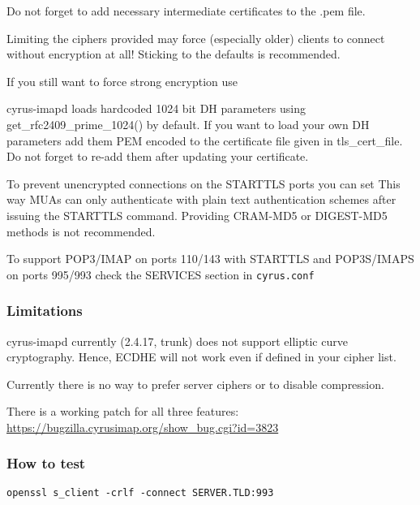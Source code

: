 Do not forget to add necessary intermediate certificates to the .pem file.

Limiting the ciphers provided may force (especially older) clients to connect without encryption at all! Sticking to the defaults is recommended.

If you still want to force strong encryption use

cyrus-imapd loads hardcoded 1024 bit DH parameters using get\_rfc2409\_prime\_1024() by default. If you want to load your own DH parameters add them PEM encoded to the certificate file given in tls\_cert\_file. Do not forget to re-add them after updating your certificate.

To prevent unencrypted connections on the STARTTLS ports you can set
This way MUAs can only authenticate with plain text authentication schemes after issuing the STARTTLS command. Providing CRAM-MD5 or DIGEST-MD5 methods is not recommended.

To support POP3/IMAP on ports 110/143 with STARTTLS and POP3S/IMAPS on ports
995/993 check the SERVICES section in \texttt{cyrus.conf}


\subsubsection{Limitations}
cyrus-imapd currently (2.4.17, trunk) does not support elliptic curve cryptography. Hence, ECDHE will not work even if defined in your cipher list.

Currently there is no way to prefer server ciphers or to disable compression.

There is a working patch for all three features:
\url{https://bugzilla.cyrusimap.org/show_bug.cgi?id=3823}

\subsubsection{How to test}
\begin{lstlisting}
openssl s_client -crlf -connect SERVER.TLD:993
\end{lstlisting}



